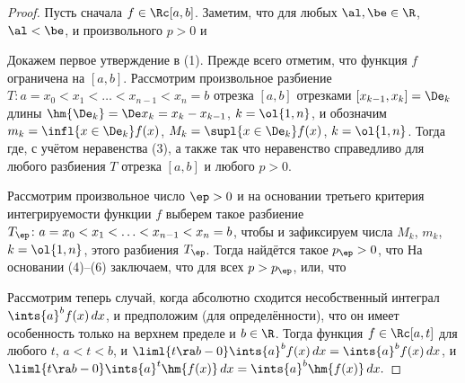 \documentclass[a4paper]{article}
\begin{document}
\begin{proof}
Пусть сначала $f\in\Rc[a,b]$. Заметим, что для любых $\al,\be\in\R$,
$\al<\be$, и произвольного $p>0$  и

Докажем первое утверждение в (1). Прежде всего отметим, что функция
$f$ ограничена на $[a,b]$. Рассмотрим произвольное разбиение
$T\colon a=x_0<x_1<\ldots<x_{n-1}<x_n=b$ отрезка $[a,b]$ отрезками
$[x_{k-1},x_k] = \De_k$ длины $\hm{\De_k} = \De x_k = x_k -
x_{k-1}$, $k=\ol{1,n}$, и обозначим $m_k = \infl{x\in \De_k} f(x)$,
$M_k = \supl{x\in \De_k} f(x)$, $k=\ol{1,n}$. Тогда  где, с учётом неравенства (3),
 а также
 так что неравенство
 справедливо для любого разбиения $T$
отрезка $[a,b]$ и любого $p>0$.

Рассмотрим произвольное число $\ep>0$ и на основании третьего
критерия интегрируемости функции $f$ выберем такое разбиение
$T_{\ep}\colon a=x_0 < x_1 < \ldots < x_{n-1} < x_n=b$, чтобы
 и
зафиксируем числа $M_k$, $m_k$, $k=\ol{1,n}$, этого разбиения
$T_{\ep}$. Тогда найдётся такое $p_{\ep}>0$, что  На основании (4)--(6)
заключаем, что  для всех $p>p_{\ep}$, или, что

Рассмотрим теперь случай, когда абсолютно сходится несобственный
интеграл $\ints{a}^b f(x)\,dx$, и предположим (для определённости),
что он имеет особенность только на верхнем пределе и $b\in\R$. Тогда
функция $f\in\Rc[a,t]$ для любого $t$, $a<t<b$, и $\liml{t\ra b-0}
\ints{a}^b f(x)\,dx = \ints{a}^b f(x)\,dx$, и $\liml{t\ra b-0}
\ints{a}^t \hm{f(x)}\,dx = \ints{a}^b \hm{f(x)}\,dx.$


\end{proof}
\end{document}
